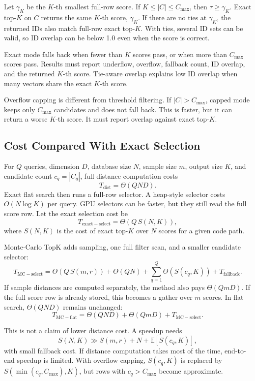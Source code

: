 Let $\gamma_K$ be the $K$-th smallest full-row score. If
$K \leq |C| \leq C_{\max}$, then $\tau \geq \gamma_K$. Exact top-$K$ on $C$
returns the same $K$-th score, $\gamma_K$. If there are no ties at $\gamma_K$,
the returned IDs also match
full-row exact top-$K$. With ties, several ID sets can be valid, so ID overlap
can be below 1.0 even when the score is correct.

Exact mode falls back when fewer than $K$ scores pass, or when more than
$C_{\max}$ scores pass. Results must report underflow, overflow, fallback
count, ID overlap, and the returned $K$-th score. Tie-aware overlap explains
low ID overlap when many vectors share the exact $K$-th score.

Overflow capping is different from threshold filtering. If $|C|>C_{\max}$,
capped mode keeps only $C_{\max}$ candidates and does not fall back. This is
faster, but it can return a worse $K$-th score. It must report overlap against
exact top-$K$.

\subsection{Cost Compared With Exact Selection}

For $Q$ queries, dimension $D$, database size $N$, sample size $m$, output size
$K$, and candidate count $c_q=|C_q|$, full distance computation costs
\[
  T_{\mathrm{dist}} = \Theta(QND).
\]
Exact flat search then runs a full-row selector. A heap-style selector costs
$O(N\log K)$ per query. GPU selectors can be faster, but they still read the
full score row. Let the exact selection cost be
\[
  T_{\mathrm{exact-select}} = \Theta(Q\,S(N,K)),
\]
where $S(N,K)$ is the cost of exact top-$K$ over $N$ scores for a given code
path.

Monte-Carlo TopK adds sampling, one full filter scan, and a smaller candidate
selector:
\[
  T_{\mathrm{MC-select}} =
  \Theta(Q\,S(m,r)) + \Theta(QN) +
  \sum_{q=1}^{Q}\Theta(S(c_q,K)) + T_{\mathrm{fallback}}.
\]
If sample distances are computed separately, the method also pays
$\Theta(QmD)$. If the full score row is already stored, this becomes a gather
over $m$ scores. In flat search, $\Theta(QND)$ remains unchanged:
\[
  T_{\mathrm{MC-flat}} =
  \Theta(QND) + \Theta(QmD) + T_{\mathrm{MC-select}}.
\]

This is not a claim of lower distance cost. A speedup needs
\[
  S(N,K) \gg S(m,r) + N + \mathbb{E}[S(c_q,K)],
\]
with small fallback cost. If distance computation takes most of the time,
end-to-end speedup is limited. With overflow capping, $S(c_q,K)$ is replaced by
$S(\min(c_q,C_{\max}),K)$, but rows with $c_q>C_{\max}$ become approximate.

